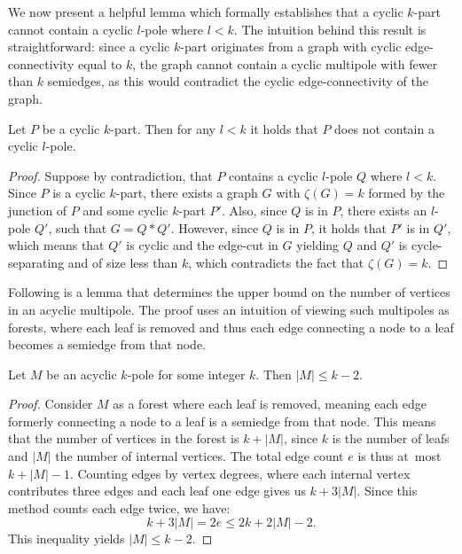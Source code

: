 \documentclass[12pt, twoside]{book}
\begin{document}
We now present a helpful lemma which formally establishes that a cyclic $k$-part cannot contain a cyclic $l$-pole where $l<k$. The intuition behind this result is straightforward: since a cyclic $k$-part originates from a graph with cyclic edge-connectivity equal to $k$, the graph cannot contain a cyclic multipole with fewer than $k$ semiedges, as this would contradict the cyclic edge-connectivity of the graph.

\begin{lemma}\label{lem:cyclic-part-no-small-cyclic-l-pole}
	Let $P$ be a cyclic $k$-part. Then for any $l<k$ it holds that $P$ does not contain a cyclic $l$-pole.
\end{lemma}

\begin{proof}
	Suppose by contradiction, that $P$ contains a cyclic $l$-pole $Q$ where $l<k$. Since $P$ is a cyclic $k$-part, there exists a graph $G$ with $\zeta(G)=k$ formed by the junction of $P$ and some cyclic $k$-part $P'$. Also, since $Q$ is in $P$, there exists an $l$-pole $Q'$, such that $G=Q*Q'$. However, since $Q$ is in $P$, it holds that $P'$ is in $Q'$, which means that $Q'$ is cyclic and the edge-cut in $G$ yielding $Q$ and $Q'$ is cycle-separating and of size less than $k$, which contradicts the fact that $\zeta(G)=k$.
\end{proof}

Following is a lemma that determines the upper bound on the number of vertices in an acyclic multipole. The proof uses an intuition of viewing such multipoles as forests, where each leaf is removed and thus each edge connecting a node to a leaf becomes a semiedge from that node.

\begin{lemma}\label{lem:number-of-vertices-in-acyclic-k-pole}
	Let $M$ be an acyclic $k$-pole for some integer $k$. Then $|M|\leq k-2$. 
\end{lemma}

\begin{proof}
	Consider $M$ as a forest where each leaf is removed, meaning each edge formerly connecting a node to a leaf is a semiedge from that node. This means that the number of vertices in the forest is $k+|M|$, since $k$ is the number of leafs and $|M|$ the number of internal vertices. The total edge count $e$ is thus at~most $k+|M|-1$. Counting edges by vertex degrees, where each internal vertex contributes three edges and each leaf one edge gives us $k+3|M|$. Since this method counts each edge twice, we have:
	$$k+3|M|=2e\leq 2k+2|M|-2.$$
	This inequality yields $|M|\leq k-2$.
\end{proof}
\end{document}
